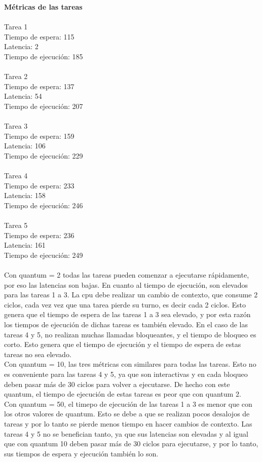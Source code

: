 {\bf Métricas de las tareas}\\\\
Tarea 1\\
Tiempo de espera: 115\\
Latencia: 2\\
Tiempo de ejecución: 185\\\\
Tarea 2\\
Tiempo de espera: 137\\
Latencia: 54\\
Tiempo de ejecución: 207\\\\
Tarea 3\\
Tiempo de espera: 159\\
Latencia: 106\\
Tiempo de ejecución: 229\\\\
Tarea 4\\
Tiempo de espera: 233\\
Latencia: 158\\
Tiempo de ejecución: 246\\\\
Tarea 5\\
Tiempo de espera: 236\\
Latencia: 161\\
Tiempo de ejecución: 249\\\\
Con quantum = 2 todas las tareas pueden comenzar a ejecutarse rápidamente, por eso las latencias son bajas. En cuanto al tiempo de ejecución, son elevados para las tareas 1 a 3. La cpu debe
realizar un cambio de contexto, que consume 2 ciclos, cada vez vez que una tarea pierde su turno, es decir cada 2 ciclos. Esto genera que el tiempo de espera de las tareas 1 a 3 sea elevado, y
por esta razón los tiempos de ejecución de dichas tareas es también elevado. En el caso de las tareas 4 y 5, no realizan muchas llamadas bloqueantes, y el tiempo de bloqueo es corto. Esto genera que el tiempo de ejecución 
y el tiempo de espera de estas tareas
no sea elevado.\\

Con quantum = 10, las tres métricas con similares para todas las tareas. Esto no es conveniente para las tareas 4 y 5, ya que son interactivas y en cada bloqueo deben pasar
más de 30 ciclos para volver a ejecutarse. De hecho con este quantum, el tiempo de ejecución de estas tareas es peor que con quantum 2.\\

Con quantum = 50, el timepo de ejecución de las tareas 1 a 3 es menor que con los otros valores de quantum. Esto se debe a que se realizan pocos desalojos de tareas y por lo tanto se pierde menos tiempo en hacer cambios de contexto.
Las tareas 4 y 5 no se benefician tanto, ya que sus latencias son elevadas y al igual que con quantum 10 deben pasar más de 30 ciclos para ejecutarse, y por lo tanto, sus tiempos de espera y ejecución también lo son.